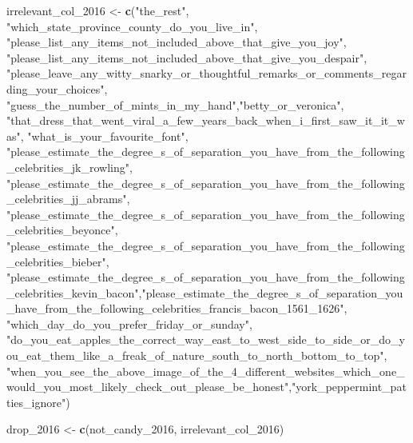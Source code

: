 \documentclass[
]{article}
\newenvironment{Shaded}{\begin{snugshade}}{\end{snugshade}}
\newcommand{\FunctionTok}[1]{\textcolor[rgb]{0.13,0.29,0.53}{\textbf{#1}}}
\newcommand{\NormalTok}[1]{#1}
\newcommand{\OtherTok}[1]{\textcolor[rgb]{0.56,0.35,0.01}{#1}}
\newcommand{\StringTok}[1]{\textcolor[rgb]{0.31,0.60,0.02}{#1}}
\begin{document}
\begin{Shaded}
\begin{Highlighting}[]
\NormalTok{irrelevant\_col\_2016 }\OtherTok{\textless{}{-}} \FunctionTok{c}\NormalTok{(}\StringTok{"the\_rest"}\NormalTok{, }\StringTok{"which\_state\_province\_county\_do\_you\_live\_in"}\NormalTok{, }\StringTok{"please\_list\_any\_items\_not\_included\_above\_that\_give\_you\_joy"}\NormalTok{,                       }\StringTok{"please\_list\_any\_items\_not\_included\_above\_that\_give\_you\_despair"}\NormalTok{, }\StringTok{"please\_leave\_any\_witty\_snarky\_or\_thoughtful\_remarks\_or\_comments\_regarding\_your\_choices"}\NormalTok{, }\StringTok{"guess\_the\_number\_of\_mints\_in\_my\_hand"}\NormalTok{,}\StringTok{"betty\_or\_veronica"}\NormalTok{, }\StringTok{"that\_dress\_that\_went\_viral\_a\_few\_years\_back\_when\_i\_first\_saw\_it\_it\_was"}\NormalTok{, }\StringTok{"what\_is\_your\_favourite\_font"}\NormalTok{, }\StringTok{"please\_estimate\_the\_degree\_s\_of\_separation\_you\_have\_from\_the\_following\_celebrities\_jk\_rowling"}\NormalTok{, }\StringTok{"please\_estimate\_the\_degree\_s\_of\_separation\_you\_have\_from\_the\_following\_celebrities\_jj\_abrams"}\NormalTok{,         }\StringTok{"please\_estimate\_the\_degree\_s\_of\_separation\_you\_have\_from\_the\_following\_celebrities\_beyonce"}\NormalTok{, }\StringTok{"please\_estimate\_the\_degree\_s\_of\_separation\_you\_have\_from\_the\_following\_celebrities\_bieber"}\NormalTok{,            }\StringTok{"please\_estimate\_the\_degree\_s\_of\_separation\_you\_have\_from\_the\_following\_celebrities\_kevin\_bacon"}\NormalTok{,}\StringTok{"please\_estimate\_the\_degree\_s\_of\_separation\_you\_have\_from\_the\_following\_celebrities\_francis\_bacon\_1561\_1626"}\NormalTok{, }\StringTok{"which\_day\_do\_you\_prefer\_friday\_or\_sunday"}\NormalTok{, }\StringTok{"do\_you\_eat\_apples\_the\_correct\_way\_east\_to\_west\_side\_to\_side\_or\_do\_you\_eat\_them\_like\_a\_freak\_of\_nature\_south\_to\_north\_bottom\_to\_top"}\NormalTok{, }\StringTok{"when\_you\_see\_the\_above\_image\_of\_the\_4\_different\_websites\_which\_one\_would\_you\_most\_likely\_check\_out\_please\_be\_honest"}\NormalTok{,}\StringTok{"york\_peppermint\_patties\_ignore"}\NormalTok{)}
                         
\NormalTok{drop\_2016 }\OtherTok{\textless{}{-}} \FunctionTok{c}\NormalTok{(not\_candy\_2016, irrelevant\_col\_2016)}


\end{Highlighting}
\end{Shaded}
\end{document}

